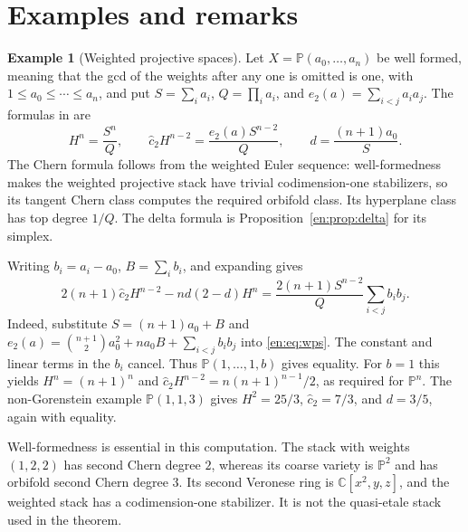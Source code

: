 \documentclass[12pt]{amsart}
\theoremstyle{definition}
\newtheorem{eg}[thm]{Example}
\theoremstyle{remark}
\numberwithin{equation}{section}
\theoremstyle{plain}
\theoremstyle{definition}
\theoremstyle{remark}
\begin{document}
\section{Examples and remarks}\label{en:sec:examples}
\begin{eg}[Weighted projective spaces]\label{en:ex:wps}
Let $X=\mathbb P(a_0,\ldots,a_n)$ be well formed, meaning that the gcd of the weights after any one is omitted is one, with
$1\le a_0\le\cdots\le a_n$, and put $S=\sum_i a_i$, $Q=\prod_i a_i$,
and $e_2(a)=\sum_{i<j}a_i a_j$. The formulas in
\cite[Example~7.5, (7.7)--(7.10)]{en:HI} are
\begin{equation}\label{en:eq:wps}
 H^n=\frac{S^n}{Q},\qquad
 \widehat c_2H^{n-2}=\frac{e_2(a)S^{n-2}}Q,\qquad
 d=\frac{(n+1)a_0}{S}.
\end{equation}
The Chern formula follows from the weighted Euler sequence: well-formedness makes the weighted projective stack have trivial codimension-one stabilizers, so its tangent Chern class computes the required orbifold class. Its hyperplane class has top degree $1/Q$. The delta formula is Proposition~\ref{en:prop:delta} for its simplex.

Writing $b_i=a_i-a_0$, $B=\sum_i b_i$, and expanding gives
\begin{equation}\label{en:eq:wps-gap}
 2(n+1)\widehat c_2H^{n-2}-nd(2-d)H^n
 =\frac{2(n+1)S^{n-2}}Q\sum_{i<j}b_i b_j.
\end{equation}
Indeed, substitute $S=(n+1)a_0+B$ and
$e_2(a)=\binom{n+1}{2}a_0^2+na_0B+\sum_{i<j}b_i b_j$
into \eqref{en:eq:wps}. The constant and linear terms in the $b_i$ cancel.
Thus $\mathbb P(1,\ldots,1,b)$ gives equality. For $b=1$ this yields
$H^n=(n+1)^n$ and $\widehat c_2H^{n-2}=n(n+1)^{n-1}/2$, as required for $\mathbb P^n$. The non-Gorenstein example $\mathbb P(1,1,3)$ gives
$H^2=25/3$, $\widehat c_2=7/3$, and $d=3/5$, again with equality.

Well-formedness is essential in this computation. The stack with weights
$(1,2,2)$ has second Chern degree $2$, whereas its coarse variety is
$\mathbb P^2$ and has orbifold second Chern degree $3$. Its second Veronese ring is $\mathbb C[x^2,y,z]$, and the weighted stack has a codimension-one stabilizer. It is not the quasi-etale stack used in the theorem.
\end{eg}
\end{document}
